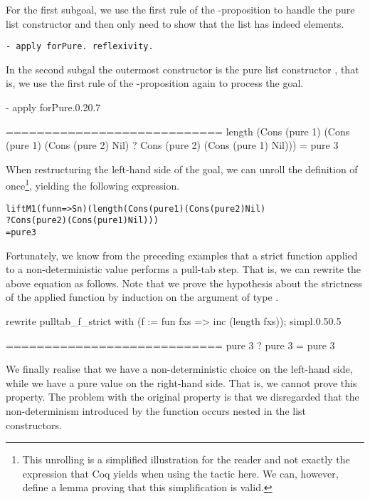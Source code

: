 For the first subgoal, we use the first rule of the \--proposition to handle the pure list constructor and then only need to show that the list has indeed  elements.

\begin{verbatim}
- apply forPure. reflexivity.
\end{verbatim}

In the second subgal the outermost constructor is the pure list constructor , that is, we use the first rule of the \--proposition again to process the goal.

\begin{cproof1}{- apply forPure.}{0.2}{0.7}

  ============================
  length (Cons (pure 1) (Cons (pure 1) (Cons (pure 2) Nil)
         ? Cons (pure 2) (Cons (pure 1) Nil)))
  = pure 3
\end{cproof1}

When restructuring the left\--hand side of the goal, we can unroll the definition of  once\footnote{This unrolling is a simplified illustration for the reader and not exactly the expression that Coq yields when using the tactic  here. We can, however, define a lemma proving that this simplification is valid.}, yielding the following expression.

\begin{alltt}
  liftM1 (fun n => S n) (length (Cons (pure 1) (Cons (pure 2) Nil)
                                ? Cons (pure 2) (Cons (pure 1) Nil)))
  = pure 3
\end{alltt}

Fortunately, we know from the preceding examples that a strict function applied to a non\--deterministic value performs a pull\--tab step.
That is, we can rewrite the above equation as follows.
Note that we prove the hypothesis about the strictness of the applied function  by induction on the argument of type .

\begin{cproof1}{rewrite pulltab_f_strict with (f := fun fxs => inc (length fxs)); simpl.}{0.5}{0.5}

  ============================
  pure 3 ? pure 3 = pure 3
\end{cproof1}

We finally realise that we have a non\--deterministic choice on the left\--hand side, while we have a pure value on the right\--hand side.
That is, we cannot prove this property.
The problem with the original property is that we disregarded that the non\--determinism introduced by the function  occurs nested in the list constructors.

